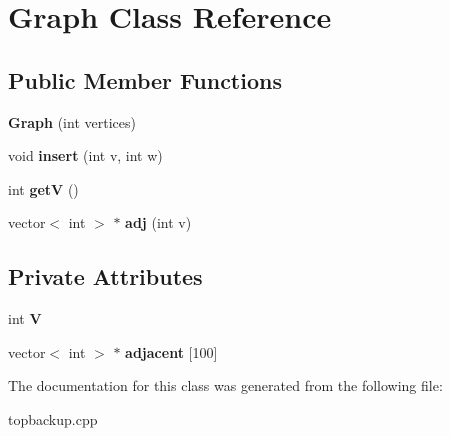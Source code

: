 \hypertarget{classGraph}{\section{Graph Class Reference}
\label{classGraph}
}
\subsection*{Public Member Functions}
\begin{DoxyCompactItemize}
\item 
\hypertarget{classGraph_a7377fb78cab55e7d3bb72d151ccaecba}{{\bfseries Graph} (int vertices)}\label{classGraph_a7377fb78cab55e7d3bb72d151ccaecba}

\item 
\hypertarget{classGraph_a086a8618c71e413fe4e844c63ad8b7fe}{void {\bfseries insert} (int v, int w)}\label{classGraph_a086a8618c71e413fe4e844c63ad8b7fe}

\item 
\hypertarget{classGraph_a8af27b207ab5880d31b61a2e3e4bee93}{int {\bfseries get\+V} ()}\label{classGraph_a8af27b207ab5880d31b61a2e3e4bee93}

\item 
\hypertarget{classGraph_affed149c8318152657605a702bab958b}{vector$<$ int $>$ $\ast$ {\bfseries adj} (int v)}\label{classGraph_affed149c8318152657605a702bab958b}

\end{DoxyCompactItemize}
\subsection*{Private Attributes}
\begin{DoxyCompactItemize}
\item 
\hypertarget{classGraph_a2b722f7cfa7a21e4cb5fae488b3d4dcc}{int {\bfseries V}}\label{classGraph_a2b722f7cfa7a21e4cb5fae488b3d4dcc}

\item 
\hypertarget{classGraph_ac3202cdbc018cf7e9909608a264d7ce2}{vector$<$ int $>$ $\ast$ {\bfseries adjacent} \mbox{[}100\mbox{]}}\label{classGraph_ac3202cdbc018cf7e9909608a264d7ce2}

\end{DoxyCompactItemize}


The documentation for this class was generated from the following file\+:\begin{DoxyCompactItemize}
\item 
topbackup.\+cpp\end{DoxyCompactItemize}
